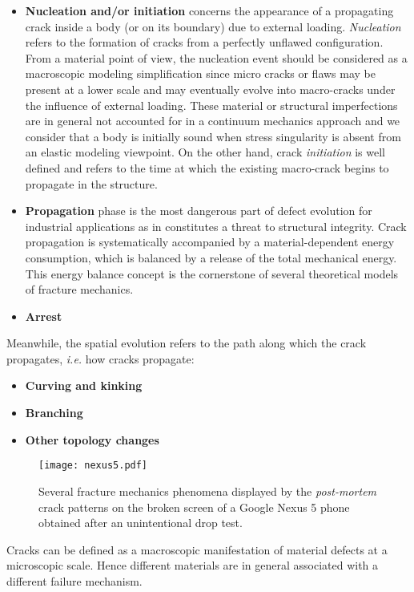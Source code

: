 \begin{itemize}
\item \textbf{Nucleation and/or initiation} concerns the appearance of a propagating crack inside a body (or on its boundary) due to external loading. \emph{Nucleation} refers to the formation of cracks from a perfectly unflawed configuration. From a material point of view, the nucleation event should be considered as a macroscopic modeling simplification since micro cracks or flaws may be present at a lower scale and may eventually evolve into macro-cracks under the influence of external loading. These material or structural imperfections are in general not accounted for in a continuum mechanics approach and we consider that a body is initially sound when stress singularity is absent from an elastic modeling viewpoint. On the other hand, crack \emph{initiation} is well defined and refers to the time at which the existing macro-crack begins to propagate in the structure.

\item \textbf{Propagation} phase is 
the most dangerous part of defect evolution for industrial applications as in constitutes a threat to structural integrity. Crack propagation is systematically accompanied by a material-dependent energy consumption, which is balanced by a release of the total mechanical energy. This energy balance concept is the cornerstone of several theoretical models of fracture mechanics.

\item \textbf{Arrest}
\end{itemize}

Meanwhile, the spatial evolution refers to the path along which the crack propagates, \emph{i.e.} how cracks propagate:
\begin{itemize}
\item \textbf{Curving and kinking}
\item \textbf{Branching}
\item \textbf{Other topology changes}
\end{itemize}


\begin{figure}[htbp]
\centering
\texttt{[image: nexus5.pdf]}
\caption{Several fracture mechanics phenomena displayed by the \emph{post-mortem} crack patterns on the broken screen of a Google Nexus 5 phone obtained after an unintentional drop test.}
\end{figure}

Cracks can be defined as a macroscopic manifestation of material defects at a microscopic scale. Hence different materials are in general associated with a different failure mechanism.

